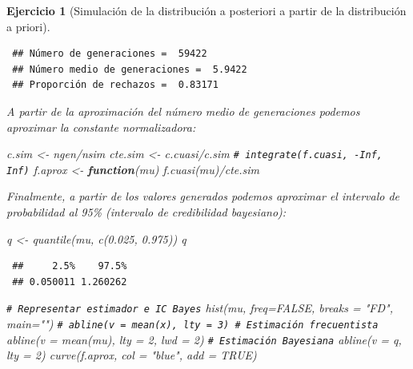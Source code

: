 \documentclass[
  10pt,
]{book}
\newenvironment{Shaded}{\begin{snugshade}}{\end{snugshade}}
\newcommand{\AttributeTok}[1]{\textcolor[rgb]{0.77,0.63,0.00}{#1}}
\newcommand{\CommentTok}[1]{\textcolor[rgb]{0.56,0.35,0.01}{\textit{#1}}}
\newcommand{\ConstantTok}[1]{\textcolor[rgb]{0.00,0.00,0.00}{#1}}
\newcommand{\ControlFlowTok}[1]{\textcolor[rgb]{0.13,0.29,0.53}{\textbf{#1}}}
\newcommand{\DecValTok}[1]{\textcolor[rgb]{0.00,0.00,0.81}{#1}}
\newcommand{\FloatTok}[1]{\textcolor[rgb]{0.00,0.00,0.81}{#1}}
\newcommand{\FunctionTok}[1]{\textcolor[rgb]{0.00,0.00,0.00}{#1}}
\newcommand{\NormalTok}[1]{#1}
\newcommand{\OtherTok}[1]{\textcolor[rgb]{0.56,0.35,0.01}{#1}}
\newcommand{\SpecialCharTok}[1]{\textcolor[rgb]{0.00,0.00,0.00}{#1}}
\newcommand{\StringTok}[1]{\textcolor[rgb]{0.31,0.60,0.02}{#1}}
\theoremstyle{break}
\newtheorem{exercise}{Ejercicio}[chapter]
\theoremstyle{nonumberplain}
\renewcommand{\CommentTok}[1]{\textcolor[rgb]{0.41,0.41,0.41}{\texttt{#1}}}
\begin{document}
\begin{exercise}[Simulación de la distribución a posteriori a partir de la distribución a priori]
\begin{enumerate}
\begin{verbatim}
 ## Número de generaciones =  59422
 ## Número medio de generaciones =  5.9422
 ## Proporción de rechazos =  0.83171
\end{verbatim}

  A partir de la aproximación del número medio de generaciones podemos aproximar la constante normalizadora:

\begin{Shaded}
\begin{Highlighting}[]
\NormalTok{c.sim }\OtherTok{\textless{}{-}}\NormalTok{ ngen}\SpecialCharTok{/}\NormalTok{nsim}
\NormalTok{cte.sim }\OtherTok{\textless{}{-}}\NormalTok{ c.cuasi}\SpecialCharTok{/}\NormalTok{c.sim}
\CommentTok{\# integrate(f.cuasi, {-}Inf, Inf)}
\NormalTok{f.aprox }\OtherTok{\textless{}{-}} \ControlFlowTok{function}\NormalTok{(mu) }\FunctionTok{f.cuasi}\NormalTok{(mu)}\SpecialCharTok{/}\NormalTok{cte.sim}
\end{Highlighting}
\end{Shaded}

  Finalmente, a partir de los valores generados podemos aproximar el intervalo de probabilidad al 95\% (intervalo de credibilidad bayesiano):

\begin{Shaded}
\begin{Highlighting}[]
\NormalTok{q }\OtherTok{\textless{}{-}} \FunctionTok{quantile}\NormalTok{(mu, }\FunctionTok{c}\NormalTok{(}\FloatTok{0.025}\NormalTok{, }\FloatTok{0.975}\NormalTok{))}
\NormalTok{q}
\end{Highlighting}
\end{Shaded}

\begin{verbatim}
 ##     2.5%    97.5% 
 ## 0.050011 1.260262
\end{verbatim}

\begin{Shaded}
\begin{Highlighting}[]
\CommentTok{\# Representar estimador e IC Bayes}
\FunctionTok{hist}\NormalTok{(mu, }\AttributeTok{freq=}\ConstantTok{FALSE}\NormalTok{, }\AttributeTok{breaks =} \StringTok{"FD"}\NormalTok{, }\AttributeTok{main=}\StringTok{""}\NormalTok{)}
\CommentTok{\# abline(v = mean(x), lty = 3) \# Estimación frecuentista}
\FunctionTok{abline}\NormalTok{(}\AttributeTok{v =} \FunctionTok{mean}\NormalTok{(mu), }\AttributeTok{lty =} \DecValTok{2}\NormalTok{, }\AttributeTok{lwd =} \DecValTok{2}\NormalTok{)  }\CommentTok{\# Estimación Bayesiana}
\FunctionTok{abline}\NormalTok{(}\AttributeTok{v =}\NormalTok{ q, }\AttributeTok{lty =} \DecValTok{2}\NormalTok{)}
\FunctionTok{curve}\NormalTok{(f.aprox, }\AttributeTok{col =} \StringTok{"blue"}\NormalTok{, }\AttributeTok{add =} \ConstantTok{TRUE}\NormalTok{)}
\end{Highlighting}
\end{Shaded}


\end{enumerate}
\end{exercise}
\end{document}

